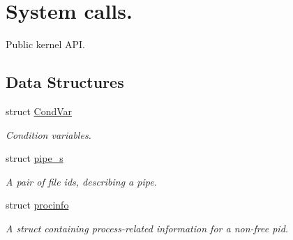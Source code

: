 \hypertarget{group__syscalls}{}\section{System calls.}
\label{group__syscalls}


Public kernel A\+PI.  


\subsection*{Data Structures}
\begin{DoxyCompactItemize}
\item 
struct \hyperlink{structCondVar}{Cond\+Var}
\begin{DoxyCompactList}\small\item\em Condition variables. \end{DoxyCompactList}\item 
struct \hyperlink{structpipe__s}{pipe\+\_\+s}
\begin{DoxyCompactList}\small\item\em A pair of file ids, describing a pipe. \end{DoxyCompactList}\item 
struct \hyperlink{structprocinfo}{procinfo}
\begin{DoxyCompactList}\small\item\em A struct containing process-\/related information for a non-\/free pid. \end{DoxyCompactList}\end{DoxyCompactItemize}
